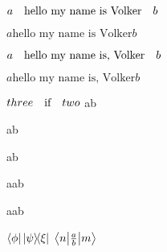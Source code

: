 \documentclass{article}
\begin{document}
$a\qqtext{hello my name is Volker}b$


$a\text{hello my name is Volker}b$


$a\qqtext{hello my name is, Volker}b$


$a\text{hello my name is, Volker}b$

$three\qif two$
\qcc
\qand
a\qc b

ab

ab

a\qqtext ab

a\qqtext* ab



\newpage
$\bra{\phi}\dyad{\psi}{\xi}$
$\mel**{n}{\frac{a}{b}}{m} $
\end{document}
